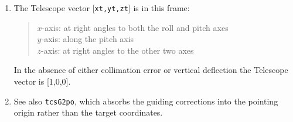 \documentclass[12pt,fleqn,twoside]{article}
\renewcommand{\_}{{\tt\char'137}}     %
\newcommand{\radec}     {$[\,\alpha,\delta\,]$}
\newcommand{\hadec}     {$[\,h,\delta\,]$}
\newcommand{\azel}      {$[\,Az,El~]$}
\begin{document}
{\begin{enumerate}
\begin{tabbing}
         \> {\tt frame  } \> {\tt FK5} \\
         \> {\tt target } \> Jxxxx \radec, current date \\
         \> {\tt spm1\_i} \>
                 mean \radec\ $\Leftarrow$ geocentric apparent \radec \\
         \> {\tt sst,cst} \> \radec\ $\Leftarrow$ \hadec \\
         \> {\tt spm2\_i} \> geocentric \hadec\ $\Leftarrow$ {\sc Aim}
      \end{tabbing}
      \begin{tabbing}
         xxx \= xxxxxxxxxx \= \kill
         \> {\tt frame  } \> {\tt APPT} \\
         \> {\tt target } \> geocentric apparent \radec \\
         \> {\tt spm1\_i} \> identity matrix \\
         \> {\tt sst,cst} \> \radec\ $\Leftarrow$ \hadec \\
         \> {\tt spm2\_i} \> geocentric \hadec\ $\Leftarrow$ {\sc Aim}
      \end{tabbing}
      \begin{tabbing}
         xxx \= xxxxxxxxxx \= \kill
         \> {\tt frame  } \> {\tt APPT\_TOPO} \\
         \> {\tt target } \> topocentric apparent \radec \\
         \> {\tt spm1\_i} \> identity matrix \\
         \> {\tt sst,cst} \> \radec\ $\Leftarrow$ \hadec \\
         \> {\tt spm2\_i} \> topocentric \hadec\ $\Leftarrow$ {\sc Aim}
      \end{tabbing}
      \begin{tabbing}
         xxx \= xxxxxxxxxx \= \kill
         \> {\tt frame  } \> {\tt AZEL\_TOPO} \\
         \> {\tt target } \> topocentric \azel\ (N thru E) \\
         \> {\tt spm1\_i} \> identity matrix \\
         \> {\tt sst,cst} \> not used \\
         \> {\tt spm2\_i} \> topocentric \azel\ $\Leftarrow$ {\sc Aim}
      \end{tabbing}

      ICRS $\approx$ FK5 J2000 to better than 25 mas.
\item The {\sc Telescope} vector [{\tt xt,yt,zt}] is in this frame:
      \begin{quote}
      $x$-axis:  at right angles to both the roll and pitch axes \\
      $y$-axis:  along the pitch axis \\
      $z$-axis:  at right angles to the other two axes
      \end{quote}
      In the absence of either collimation error or vertical deflection
      the {\sc Telescope} vector is [1,0,0].
\item See also {\tt tcsG2po}, which absorbs the guiding corrections
      into the pointing origin rather than the target coordinates.
\end{enumerate}
}
\end{document}
